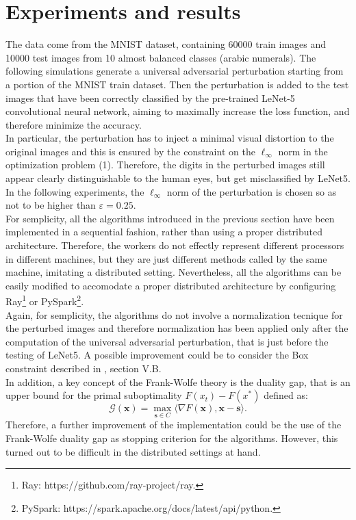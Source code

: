 \section{Experiments and results}
The data come from the MNIST dataset, containing 60000 train images and 10000 test images from 10 almost balanced classes (arabic numerals). The following simulations generate a universal adversarial perturbation starting from a portion of the MNIST train dataset. Then the perturbation is added to the test images that have been correctly classified by the pre-trained LeNet-5 convolutional neural network, aiming to maximally increase the loss function, and therefore minimize the accuracy.\\
In particular, the perturbation has to inject a minimal visual distortion to the original images and this is ensured by the constraint on the $\ell_{\infty}$ norm in the optimization problem (1). Therefore, the digits in the perturbed images still appear clearly distinguishable to the human eyes, but get misclassified by LeNet5.\\
In the following experiments, the $\ell_{\infty}$ norm of the perturbation is chosen so as not to be higher than $\varepsilon=0.25$.\\

For semplicity, all the algorithms introduced in the previous section have been implemented in a sequential fashion, rather than using a proper distributed architecture. Therefore, the workers do not effectly represent different processors in different machines, but they are just different methods called by the same machine, imitating a distributed setting. Nevertheless, all the algorithms can be easily modified to accomodate a proper distributed architecture by configuring Ray\footnote{Ray: https://github.com/ray-project/ray.} or PySpark\footnote{PySpark: https://spark.apache.org/docs/latest/api/python.}.\\

Again, for semplicity, the algorithms do not involve a normalization tecnique for the perturbed images and therefore normalization has been applied only after the computation of the universal adversarial perturbation, that is just before the testing of LeNet5. A possible improvement could be to consider the Box constraint described in \cite{A1}, section V.B.\\

In addition, a key concept of the Frank-Wolfe theory is the duality gap, that is an upper bound for the primal suboptimality $F(x_t)-F(x^*)$ defined as:
\begin{equation}
	\mathcal{G}(\mathbf{x}) =\max_{\mathbf{s}\in\mathit{C}} \langle \nabla F(\mathbf{x}),\mathbf{x}-\mathbf{s}\rangle.
\end{equation}
Therefore, a further improvement of the implementation could be the use of the Frank-Wolfe duality gap as stopping criterion for the algorithms. However, this turned out to be difficult in the distributed settings at hand.

